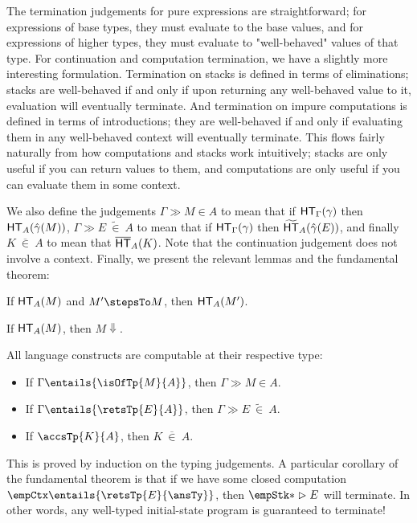 \documentclass[letterpaper]{article}
\newcommand{\exref}[3]{#1 \gg #2\in #3}
\newcommand{\exrefe}[3]{#1 \gg #2\ \tilde{\in}\ #3}
\newcommand{\exrefk}[2]{#1\ \overline{\in}\ #2}
\begin{document}
The termination judgements for pure expressions are straightforward; for expressions of base types, they must evaluate to the base values, and for expressions of higher types, they must evaluate to "well-behaved" values of that type.
For continuation and computation termination, we have a slightly more interesting formulation.
Termination on stacks is defined in terms of eliminations; stacks are well-behaved if and only if upon returning any well-behaved value to it, evaluation will eventually terminate.
And termination on impure computations is defined in terms of introductions; they are well-behaved if and only if evaluating them in any well-behaved context will eventually terminate.
This flows fairly naturally from how computations and stacks work intuitively; stacks are only useful if you can return values to them, and computations are only useful if you can evaluate them in some context.

We also define the judgements $\exref{\Gamma}{M}{A}$ to mean that if $\HT[\Gamma](\gamma)$ then $\HT[A](\hat{\gamma}(M))$, $\exrefe{\Gamma}{E}{A}$ to mean that if $\HT[\Gamma](\gamma)$ then $\HTe[A](\hat{\gamma}(E))$, and finally $\exrefk{K}{A}$ to mean that $\HTk[A](K)$.
Note that the continuation judgement does not involve a context.
Finally, we present the relevant lemmas and the fundamental theorem:

\begin{lemma}
  If $\HT[A](M)$ and $M' \stepsTo M$, then $\HT[A](M')$.
\end{lemma}

\begin{lemma}
  If $\HT[A](M)$, then $M \Downarrow$.
\end{lemma}

\begin{theorem}
  All language constructs are computable at their respective type:
  \begin{itemize}
    \item If $\Gamma \entails{\isOfTp{M}{A}}$, then $\exref{\Gamma}{M}{A}$.
    \item If $\Gamma \entails{\retsTp{E}{A}}$, then $\exrefe{\Gamma}{E}{A}$.
    \item If $\accsTp{K}{A}$, then $\exrefk{K}{A}$.
  \end{itemize}
\end{theorem}

This is proved by induction on the typing judgements.
A particular corollary of the fundamental theorem is that if we have some closed computation $\empCtx \entails{\retsTp{E}{\ansTy}}$, then $\empStk* \vartriangleright E$ will terminate.
In other words, any well-typed initial-state program is guaranteed to terminate!
\end{document}
